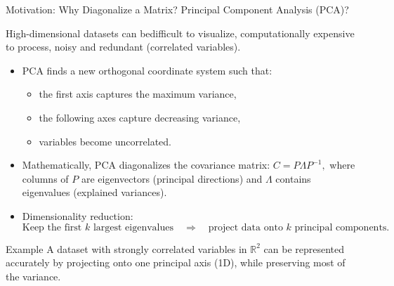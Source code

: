 \documentclass[aspectratio=169]{beamer}
\begin{document}
\begin{frame}{Motivation: Why Diagonalize a Matrix? Principal Component Analysis (PCA)?}

High-dimensional datasets can bedifficult to visualize, computationally expensive to process, noisy and redundant (correlated variables).

  \pause
\begin{itemize}
  \item PCA finds a new orthogonal coordinate system such that:
  \begin{itemize}
    \item the first axis captures the maximum variance,
    \item the following axes capture decreasing variance,
    \item variables become uncorrelated.
  \end{itemize}
  \pause

  \item Mathematically, PCA diagonalizes the covariance matrix:
$
  C = P \Lambda P^{-1},
$
  where columns of $P$ are eigenvectors (principal directions)
  and $\Lambda$ contains eigenvalues (explained variances).
  \pause

  \item Dimensionality reduction:
  \vspace{-2mm}
  \[
  \text{Keep the first $k$ largest eigenvalues} \quad \Rightarrow \quad
  \text{project data onto $k$ principal components.}
  \]
    \vspace{-9mm}
\end{itemize}

\pause
\begin{exampleblock}{Example}
A dataset with strongly correlated variables in $\mathbb{R}^2$
can be represented accurately by projecting onto one principal axis (1D),
while preserving most of the variance.
\end{exampleblock}

\end{frame}
\end{document}
